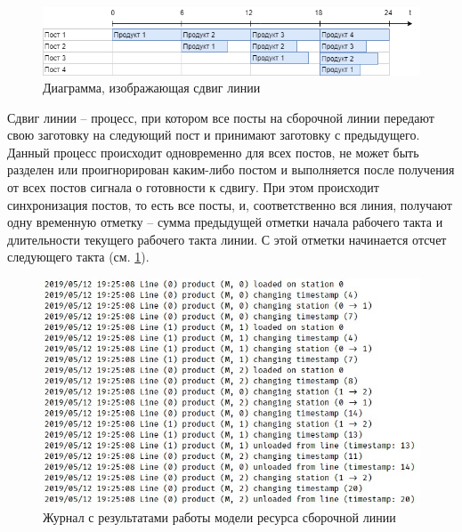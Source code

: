 \begin{figure}[ht]
	\centering
	\includegraphics[width=\linewidth]{pics/assemblyDiagram.png}
	\caption{Диаграмма, изображающая сдвиг линии}
	\label{fig:lineDiagram}
\end{figure}

\indent Сдвиг линии -- процесс, при котором все посты на сборочной линии передают свою заготовку на следующий пост и принимают заготовку с предыдущего.
Данный процесс происходит одновременно для всех постов, не может быть разделен или проигнорирован каким-либо постом и выполняется после получения от всех постов сигнала о готовности к сдвигу.
При этом происходит синхронизация постов, то есть все посты, и, соответственно вся линия, получают одну временную отметку -- сумма предыдущей отметки начала рабочего такта и длительности текущего рабочего такта линии.
С этой отметки начинается отсчет следующего такта (см. \ref{fig:lineDiagram}).

\begin{figure}[ht]
	\centering
	\includegraphics[width=\linewidth]{pics/assemblyResult.png}
	\caption{Журнал с результатами работы модели ресурса сборочной линии}
	\label{fig:lineResult}
\end{figure}

